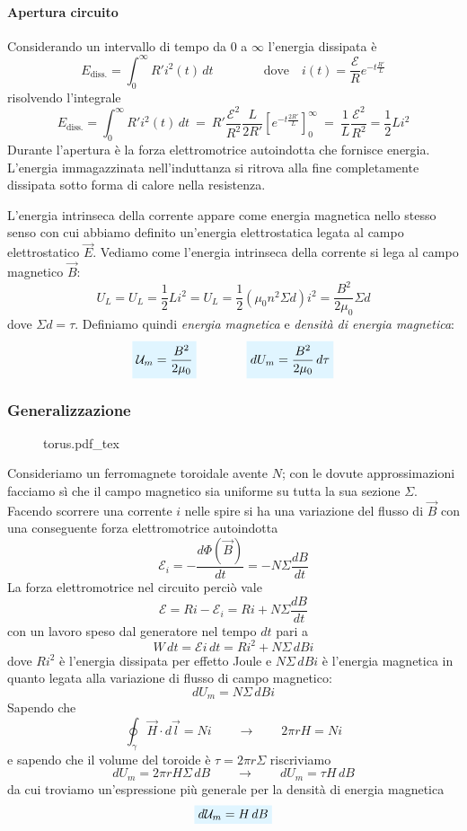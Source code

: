 \documentclass[x11names]{report}
\newcommand{\incfig}[1]{%
	{#1.pdf_tex}
}
\newcommand{\viola}[1]{%
	\colorbox{myblue}{$\displaystyle #1$}
}
\begin{document}
\paragraph{Apertura circuito} 
Considerando un intervallo di tempo da \(0\) a \(\infty\) l'energia dissipata è 
\[
E_{\text{diss.}} = \int_{0}^{\infty} R'i^2(t) \, dt \qquad \qquad \text{dove} \quad i(t) = \frac{\mathcal{E}}{R}e^{-t\frac{R'}{L}} 
\]
risolvendo l'integrale
\[
 E_{\text{diss.}} = \int_{0}^{\infty} R'i^2(t) \, dt \: = \: R'\frac{\mathcal{E}^2}{R^2} \frac{L}{2R'}\left[e^{-t\frac{2R'}{L}}\right]_0^\infty \: = \: \frac{1}{L}\frac{\mathcal{E}^2}{R^2} = \frac{1}{2}Li^2
\]
Durante l'apertura è la forza elettromotrice autoindotta che fornisce energia. L'energia immagazzinata nell'induttanza si ritrova alla fine completamente dissipata sotto forma di calore nella resistenza.

L'energia intrinseca della corrente appare come energia magnetica nello stesso senso con cui abbiamo definito un'energia elettrostatica legata al campo elettrostatico \(\vec{E}\). Vediamo come l'energia intrinseca della corrente si lega al campo magnetico \(\vec{B}\):
\[
U_L = U_L = \frac{1}{2}Li^2 = U_L = \frac{1}{2}\left(\mu_0 n^2 \Sigma d\right)i^2 = \frac{B^2}{2\mu_0}\Sigma d
\]
dove \(\Sigma d = \tau\). Definiamo quindi \textit{energia magnetica} e \textit{densità di energia magnetica}:
\begin{equation}
	 \viola{\mathcal{U}_m = \frac{B^2}{2\mu_0}}\qquad \qquad \viola{dU_m = \frac{B^2}{2\mu_0} \, d\tau} 
\end{equation}


\subsubsection{Generalizzazione}
\begin{wrapfigure}{r}{0.3\textwidth}
	\incfig{torus}
\end{wrapfigure}
Consideriamo un ferromagnete toroidale avente \(N\); con le dovute approssimazioni facciamo sì che il campo magnetico sia uniforme su tutta la sua sezione \(\Sigma\). Facendo scorrere una corrente \(i\) nelle spire si ha una variazione del flusso di \(\vec{B}\) con una conseguente forza elettromotrice autoindotta
\[
\mathcal{E}_i  =- \frac{d\Phi(\vec{B})}{dt} = -N\Sigma \frac{dB}{dt}
\]
La forza elettromotrice nel circuito perciò vale 
\[
\mathcal{E} = Ri - \mathcal{E}_i = Ri + N\Sigma \frac{dB}{dt}
\]
con un lavoro speso dal generatore nel tempo \(dt\) pari a 
\[
W \, dt = \mathcal{E}i \, dt = Ri^2 + N\Sigma \, dB i
\]
dove \(Ri^2\) è l'energia dissipata per effetto Joule e \(N\Sigma \, dB i\) è l'energia magnetica in quanto legata alla variazione di flusso di campo magnetico:
\[
dU_m = N\Sigma \, dB i
\]
Sapendo che
\[
\oint_\gamma \vec{H} \cdot d\vec{l} = Ni \qquad \to \qquad 2\pi r H = Ni 
\]
e sapendo che il volume del toroide è \(\tau = 2\pi r \Sigma\) riscriviamo
\[
dU_m = 2\pi r H \Sigma  \, dB  \qquad \to \qquad dU_m = \tau H \, dB
\]
da cui troviamo un'espressione più generale per la densità di energia magnetica
\begin{equation}
	\viola{d\mathcal{U}_m = H \, dB}
\end{equation}
\end{document}
